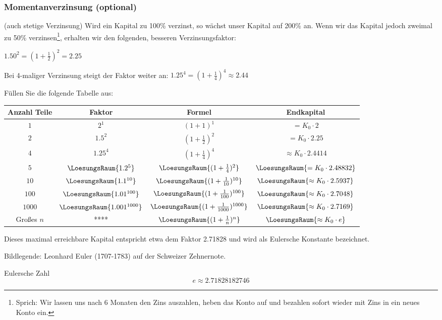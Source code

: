 \newpage

\subsubsection{Momentanverzinsung (optional)}
(auch stetige Verzinsung)
Wird ein Kapital zu 100\% verzinst, so wächst unser Kapital auf 200\%
an. Wenn wir das Kapital jedoch zweimal zu 50\%
verzinsen\footnote{Sprich: Wir lassen uns nach 6 Monaten den Zins
auszahlen, heben das Konto auf und bezahlen sofort wieder mit Zins in
ein neues Konto ein.}, erhalten wir den folgenden, besseren Verzinsungsfaktor:

$1.50^2  = (1 + \frac12)^2 = 2.25$

Bei 4-maliger Verzinsung steigt der Faktor weiter an:
$1.25^4 = (1 + \frac14)^4 \approx 2.44 $

Füllen Sie die folgende Tabelle aus:

\begin{tabular}{c|c|c|c} 
  Anzahl Teile  & Faktor                      & Formel          & Endkapital \\ \hline
  $1$           & $2^1$                      & $(1+1)^1$ & $= K_0 \cdot{} 2 $ \\ \hline
  $2$           & $1.5^2$                      & $(1+\frac12)^2$ & $= K_0 \cdot{} 2.25 $ \\ \hline
  $4$           & $1.25^4$                  & $(1+\frac14)^4$ & $\approx K_0 \cdot{} 2.4414 $ \\ \hline
  $5$           & $\LoesungsRaum{1.2^5}$  & $\LoesungsRaum{(1+\frac14)^2}$ & $\LoesungsRaum{= K_0 \cdot{} 2.48832} $ \\ \hline
  $10$           & $\LoesungsRaum{1.1^{10}}$  & $\LoesungsRaum{(1+\frac{1}{10})^{10}}$ & $\LoesungsRaum{\approx K_0 \cdot{} 2.5937} $ \\ \hline
  $100$           & $\LoesungsRaum{1.01^{100}}$  & $\LoesungsRaum{(1+\frac{1}{100})^{100}}$ & $\LoesungsRaum{\approx K_0 \cdot{} 2.7048 }$ \\ \hline
  $1000$           & $\LoesungsRaum{1.001^{1000}}$  & $\LoesungsRaum{(1+\frac{1}{1000})^{1000}}$ & $\LoesungsRaum{\approx K_0 \cdot{} 2.7169 }$ \\ \hline
  Großes $n$           & ****  & $\LoesungsRaum{(1+\frac{1}{n})^{n}}$ & $\LoesungsRaum{\approx K_0 \cdot{} e }$ \\ \hline
\end{tabular} 

Dieses maximal erreichbare Kapital entspricht etwa dem Faktor 2.71828 und
wird als Eulersche Konstante bezeichnet.

Bildlegende: Leonhard Euler (1707-1783) auf der Schweizer Zehnernote.

\begin{definition}{Eulersche Zahl}{}
$$e \approx 2.71828182746$$
\end{definition}
\newpage
